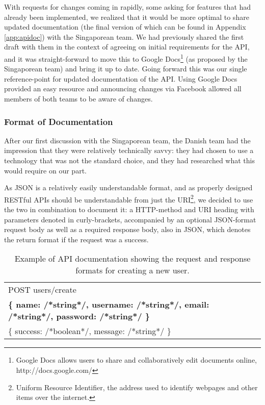 With requests for changes coming in rapidly, some asking for features that had already been implemented, we
realized that it would be more optimal to share updated documentation (the final version of which can be found in
Appendix \ref{app:apidoc}) with the Singaporean team. We had previously
shared the first draft with them in the context of agreeing on initial requirements for the API, and it was
straight-forward to move this to Google Docs\footnote{Google Docs allows users to share and collaboratively edit
documents online, http://docs.google.com/} (as proposed by the Singaporean team) and bring it up to date. Going
forward this was our single reference-point for updated documentation of the API. Using Google Docs provided an easy
resource and announcing changes via Facebook allowed all members of both teams to be aware of changes.

\subsubsection{Format of Documentation}

After our first discussion with the Singaporean team, the Danish team had the impression that they were
relatively technically savvy: they had chosen to use a technology that was not the standard choice, and
they had researched what this would require on our part.

As JSON is a relatively easily understandable format, and as properly designed RESTful APIs should be
understandable from just the URI\footnote{Uniform Resource Identifier, the address used to identify
webpages and other items over the internet.}, we decided to use the two in combination to document it: a HTTP-method
and URI heading with parameters denoted in curly-brackets, accompanied by an optional JSON-format request
body as well as a required response body, also in JSON, which denotes the return format if the request was
a success.

\begin{table}[hbt]
    \centering
    \scalebox{0.9}
    {\begin{tabular}{ | l | }
        \hline
        POST users/create \\
        \textbf{\{ name: /*string*/, username: /*string*/, email: /*string*/, password: /*string*/ \}} \\
        \{ success: /*boolean*/, message: /*string*/ \} \\
        \hline
    \end{tabular}}
    \caption{Example of API documentation showing the request and response formats for creating a new user.}
\end{table}

